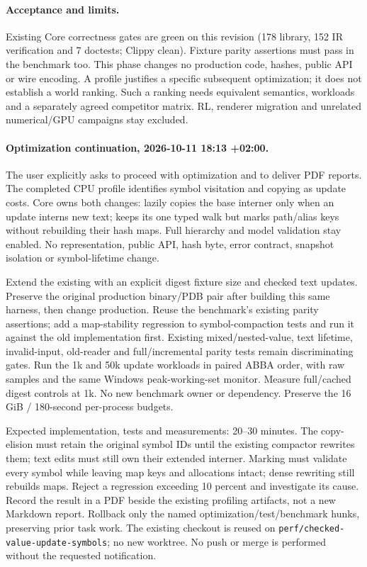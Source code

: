 \documentclass[11pt,a4paper]{article}
\begin{document}
\paragraph{Acceptance and limits.} Existing Core correctness gates are green on
this revision (178 library, 152 IR verification and 7 doctests; Clippy clean).
Fixture parity assertions must pass in the benchmark too. This phase changes no
production code, hashes, public API or wire encoding. A profile justifies a
specific subsequent optimization; it does not establish a world ranking. Such a
ranking needs equivalent semantics, workloads and a separately agreed competitor
matrix. RL, renderer migration and unrelated numerical/GPU campaigns stay excluded.

\paragraph{Optimization continuation, 2026-10-11 18:13 +02:00.}
The user explicitly asks to proceed with optimization and to deliver PDF reports.
The completed CPU profile identifies symbol visitation and copying as update costs.
Core owns both changes:  lazily copies
the base interner only when an update interns new text; 
keeps its one typed walk but marks path/alias keys without rebuilding their hash maps.
Full hierarchy and model validation stay enabled. No representation, public API,
hash byte, error contract, snapshot isolation or symbol-lifetime change.

Extend the existing  with an explicit digest fixture
size and checked text updates. Preserve the original production binary/PDB pair after
building this same harness, then change production. Reuse the benchmark's existing
parity assertions; add a map-stability regression to symbol-compaction tests and run
it against the old implementation first. Existing mixed/nested-value, text lifetime,
invalid-input, old-reader and full/incremental parity tests remain discriminating gates.
Run the 1k and 50k update workloads in paired ABBA order, with raw samples and the same
Windows peak-working-set monitor. Measure full/cached digest controls at 1k. No new
benchmark owner or dependency. Preserve the 16 GiB / 180-second per-process budgets.

Expected implementation, tests and measurements: 20--30 minutes. The copy-elision
must retain the original symbol IDs until the existing compactor rewrites them;
text edits must still own their extended interner. Marking must validate every
symbol while leaving map keys and allocations intact; dense rewriting still rebuilds
maps. Reject a regression exceeding 10 percent and investigate its cause. Record the
result in a PDF beside the existing profiling artifacts, not a new Markdown report.
Rollback only the named optimization/test/benchmark hunks, preserving prior task work.
The existing checkout is reused on \texttt{perf/checked-value-update-symbols}; no new
worktree. No push or merge is performed without the requested notification.
\end{document}
